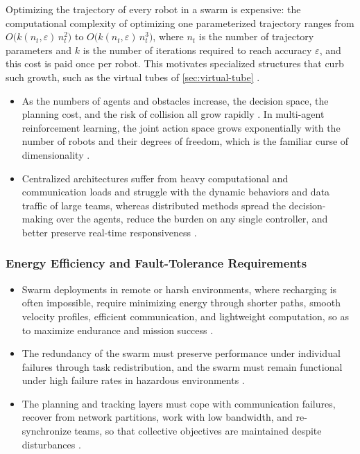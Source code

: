Optimizing the trajectory of every robot in a swarm is expensive: the
computational complexity of optimizing one parameterized trajectory ranges from
$O\bigl(k(n_t,\varepsilon)\,n_t^{2}\bigr)$ to
$O\bigl(k(n_t,\varepsilon)\,n_t^{3}\bigr)$, where $n_t$ is the number of
trajectory parameters and $k$ is the number of iterations required to reach
accuracy $\varepsilon$, and this cost is paid once per robot. This motivates
specialized structures that curb such growth, such as the virtual tubes of
\cref{sec:virtual-tube} \cite{mao2023optimal}.
\begin{itemize}
  \item {} As the numbers of agents and obstacles
        increase, the decision space, the planning cost, and the risk of
        collision all grow rapidly \cite{zhang2023multi}. In multi-agent
        reinforcement learning, the joint action space grows exponentially with
        the number of robots and their degrees of freedom, which is the familiar
        curse of dimensionality \cite{huttenrauch2019deep,kuckling2023recent}.
  \item {} Centralized architectures suffer
        from heavy computational and communication loads and struggle with the
        dynamic behaviors and data traffic of large teams, whereas distributed
        methods spread the decision-making over the agents, reduce the burden on
        any single controller, and better preserve real-time responsiveness
        \cite{lin2022review,abujabal2024path,azzam2023swarm}.
\end{itemize}

\subsubsection{Energy Efficiency and Fault-Tolerance Requirements}

\begin{itemize}
  \item {} Swarm deployments in remote or harsh
        environments, where recharging is often impossible, require minimizing
        energy through shorter paths, smooth velocity profiles, efficient
        communication, and lightweight computation, so as to maximize endurance
        and mission success \cite{lin2022review,abujabal2024path,nguyen2024swarm}.
  \item {} The redundancy of the swarm must
        preserve performance under individual failures through task
        redistribution, and the swarm must remain functional under high failure
        rates in hazardous environments \cite{nguyen2024swarm,lin2022review}.
  \item {} The planning and tracking layers must cope
        with communication failures, recover from network partitions, work with
        low bandwidth, and re-synchronize teams, so that collective objectives
        are maintained despite disturbances \cite{abujabal2024path}.
\end{itemize}

